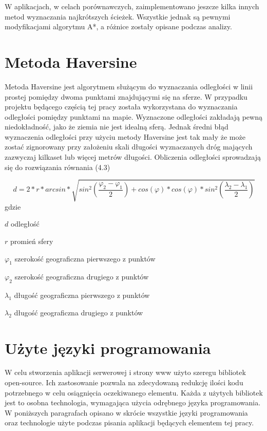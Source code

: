 W aplikacjach, w celach porównawczych, zaimplementowano jeszcze kilka innych metod wyznaczania najkrótszych ścieżek. Wszystkie jednak są pewnymi modyfikacjami algorytmu A*, a różnice zostały opisane podczas analizy.

\section{Metoda Haversine}

Metoda Haversine jest algorytmem służącym do wyznaczania odległości w linii prostej pomiędzy dwoma punktami znajdującymi się na sferze. W przypadku projektu będącego częścią tej pracy została wykorzystana do wyznaczania odległości pomiędzy punktami na mapie. Wyznaczone odległości zakładają pewną niedokładność, jako że ziemia nie jest idealną sferą. Jednak średni błąd wyznaczenia odległości przy użyciu metody Haversine jest tak mały że może zostać zignorowany przy założeniu skali długości wyznaczanych dróg mających zazwyczaj kilkaset lub więcej metrów długości.\newline
Obliczenia odległości sprowadzają się do rozwiązania równania (4.3)

\begin{equation}
d=2*r*arcsin*\sqrt{sin^2(\frac{\varphi_{2}-\varphi_{1}}{2}) + cos(\varphi)*cos(\varphi)*sin^2(\frac{\lambda_{2}-\lambda_{1}}{2})}
\end{equation}
gdzie
\begin{eqwhere}[2cm]
	\item[$d$] odległość
	\item[$r$] promień sfery
	\item[$\varphi_{1}$] szerokość geograficzna pierwszego z punktów 
	\item[$\varphi_{2}$]  szerokość geograficzna drugiego z punktów 
	\item[$\lambda_{1}$] długość geograficzna pierwszego z punktów 
	\item[$\lambda_{2}$] długość geograficzna drugiego z punktów
\end{eqwhere}

\section{Użyte języki programowania}

W celu stworzenia aplikacji serwerowej i strony www użyto szeregu bibliotek open-source. Ich zastosowanie pozwala na zdecydowaną redukcję ilości kodu potrzebnego w celu osiągnięcia oczekiwanego elementu. Każda z użytych bibliotek jest to osobna technologia, wymagająca użycia odrębnego języka programowania. W poniższych paragrafach opisano w skrócie wszystkie języki programowania oraz technologie użyte podczas pisania aplikacji będących elementem tej pracy.

